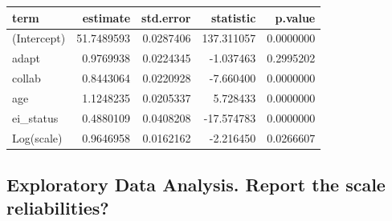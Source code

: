 \documentclass[
  letterpaper,
  DIV=11,
  numbers=noendperiod]{scrreprt}
\newenvironment{Shaded}{\begin{snugshade}}{\end{snugshade}}
\newcommand{\AttributeTok}[1]{\textcolor[rgb]{0.40,0.45,0.13}{#1}}
\newcommand{\FunctionTok}[1]{\textcolor[rgb]{0.28,0.35,0.67}{#1}}
\newcommand{\NormalTok}[1]{\textcolor[rgb]{0.00,0.23,0.31}{#1}}
\newcommand{\OtherTok}[1]{\textcolor[rgb]{0.00,0.23,0.31}{#1}}
\newcommand{\SpecialCharTok}[1]{\textcolor[rgb]{0.37,0.37,0.37}{#1}}
\newcommand{\StringTok}[1]{\textcolor[rgb]{0.13,0.47,0.30}{#1}}
\begin{document}
\begin{Shaded}
\end{Shaded}

\begin{longtable}[]{@{}lrrrr@{}}
\toprule()
term & estimate & std.error & statistic & p.value \\
\midrule()
\endhead
(Intercept) & 51.7489593 & 0.0287406 & 137.311057 & 0.0000000 \\
adapt & 0.9769938 & 0.0224345 & -1.037463 & 0.2995202 \\
collab & 0.8443064 & 0.0220928 & -7.660400 & 0.0000000 \\
age & 1.1248235 & 0.0205337 & 5.728433 & 0.0000000 \\
ei\_status & 0.4880109 & 0.0408208 & -17.574783 & 0.0000000 \\
Log(scale) & 0.9646958 & 0.0162162 & -2.216450 & 0.0266607 \\
\bottomrule()
\end{longtable}

\hypertarget{exploratory-data-analysis.-report-the-scale-reliabilities}{%
\subsection{Exploratory Data Analysis. Report the scale
reliabilities?}\label{exploratory-data-analysis.-report-the-scale-reliabilities}}
\end{document}
